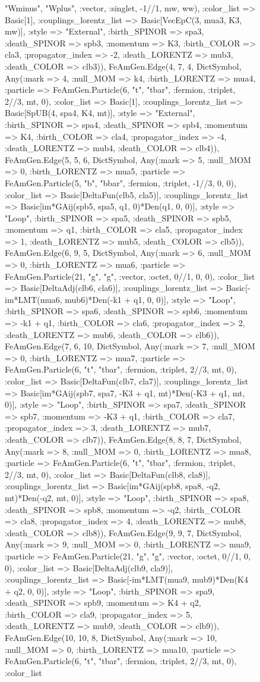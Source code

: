 \documentclass{revtex4}
\begin{document}
\begin{figure}[!htb]
\begin{center}
{"Wminus", "Wplus", :vector, :singlet, -1//1, mw, ww), :color_list => Basic[1], :couplings_lorentz_list => Basic[VecEpC(3, mua3, K3, mw)], :style => "External", :birth_SPINOR => spa3, :death_SPINOR => spb3, :momentum => K3, :birth_COLOR => cla3, :propagator_index => -2, :death_LORENTZ => mub3, :death_COLOR => clb3)), FeAmGen.Edge(4, 7, 4, Dict{Symbol, Any}(:mark => 4, :null_MOM => k4, :birth_LORENTZ => mua4, :particle => FeAmGen.Particle(6, "t", "tbar", :fermion, :triplet, 2//3, mt, 0), :color_list => Basic[1], :couplings_lorentz_list => Basic[SpUB(4, spa4, K4, mt)], :style => "External", :birth_SPINOR => spa4, :death_SPINOR => spb4, :momentum => K4, :birth_COLOR => cla4, :propagator_index => -4, :death_LORENTZ => mub4, :death_COLOR => clb4)), FeAmGen.Edge(5, 5, 6, Dict{Symbol, Any}(:mark => 5, :null_MOM => 0, :birth_LORENTZ => mua5, :particle => FeAmGen.Particle(5, "b", "bbar", :fermion, :triplet, -1//3, 0, 0), :color_list => Basic[DeltaFun(clb5, cla5)], :couplings_lorentz_list => Basic[im*GAij(spb5, spa5, q1, 0)*Den(q1, 0, 0)], :style => "Loop", :birth_SPINOR => spa5, :death_SPINOR => spb5, :momentum => q1, :birth_COLOR => cla5, :propagator_index => 1, :death_LORENTZ => mub5, :death_COLOR => clb5)), FeAmGen.Edge(6, 9, 5, Dict{Symbol, Any}(:mark => 6, :null_MOM => 0, :birth_LORENTZ => mua6, :particle => FeAmGen.Particle(21, "g", "g", :vector, :octet, 0//1, 0, 0), :color_list => Basic[DeltaAdj(clb6, cla6)], :couplings_lorentz_list => Basic[-im*LMT(mua6, mub6)*Den(-k1 + q1, 0, 0)], :style => "Loop", :birth_SPINOR => spa6, :death_SPINOR => spb6, :momentum => -k1 + q1, :birth_COLOR => cla6, :propagator_index => 2, :death_LORENTZ => mub6, :death_COLOR => clb6)), FeAmGen.Edge(7, 6, 10, Dict{Symbol, Any}(:mark => 7, :null_MOM => 0, :birth_LORENTZ => mua7, :particle => FeAmGen.Particle(6, "t", "tbar", :fermion, :triplet, 2//3, mt, 0), :color_list => Basic[DeltaFun(clb7, cla7)], :couplings_lorentz_list => Basic[im*GAij(spb7, spa7, -K3 + q1, mt)*Den(-K3 + q1, mt, 0)], :style => "Loop", :birth_SPINOR => spa7, :death_SPINOR => spb7, :momentum => -K3 + q1, :birth_COLOR => cla7, :propagator_index => 3, :death_LORENTZ => mub7, :death_COLOR => clb7)), FeAmGen.Edge(8, 8, 7, Dict{Symbol, Any}(:mark => 8, :null_MOM => 0, :birth_LORENTZ => mua8, :particle => FeAmGen.Particle(6, "t", "tbar", :fermion, :triplet, 2//3, mt, 0), :color_list => Basic[DeltaFun(clb8, cla8)], :couplings_lorentz_list => Basic[im*GAij(spb8, spa8, -q2, mt)*Den(-q2, mt, 0)], :style => "Loop", :birth_SPINOR => spa8, :death_SPINOR => spb8, :momentum => -q2, :birth_COLOR => cla8, :propagator_index => 4, :death_LORENTZ => mub8, :death_COLOR => clb8)), FeAmGen.Edge(9, 9, 7, Dict{Symbol, Any}(:mark => 9, :null_MOM => 0, :birth_LORENTZ => mua9, :particle => FeAmGen.Particle(21, "g", "g", :vector, :octet, 0//1, 0, 0), :color_list => Basic[DeltaAdj(clb9, cla9)], :couplings_lorentz_list => Basic[-im*LMT(mua9, mub9)*Den(K4 + q2, 0, 0)], :style => "Loop", :birth_SPINOR => spa9, :death_SPINOR => spb9, :momentum => K4 + q2, :birth_COLOR => cla9, :propagator_index => 5, :death_LORENTZ => mub9, :death_COLOR => clb9)), FeAmGen.Edge(10, 10, 8, Dict{Symbol, Any}(:mark => 10, :null_MOM => 0, :birth_LORENTZ => mua10, :particle => FeAmGen.Particle(6, "t", "tbar", :fermion, :triplet, 2//3, mt, 0), :color_list }
\end{center}
\end{figure}
\end{document}
